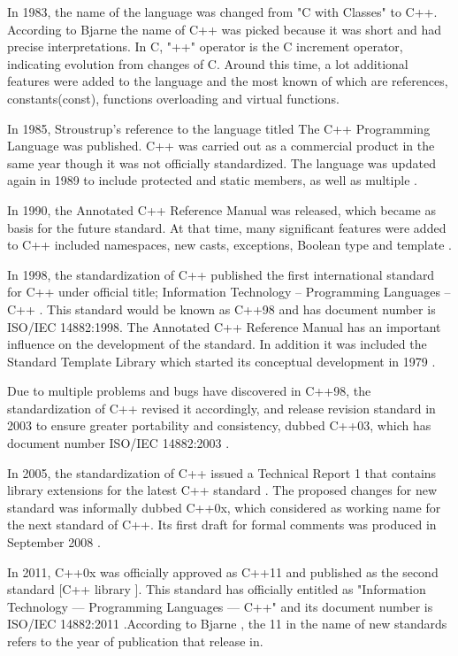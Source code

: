 \documentclass[11pt]{report}
\begin{document}
In 1983, the name of the language was changed from "C with Classes" to C++. According to Bjarne \cite{Stroustrup:1994:DesignEvolution} the name of C++ was picked because it was short and had precise interpretations. In C, "++" operator is the C increment operator, indicating evolution from changes of C.  Around this time, a lot additional features were added to the language and the most known of which are references, constants(const), functions overloading and virtual functions.

In 1985, Stroustrup's reference to the language titled The C++ Programming Language was published. C++ was carried out as a commercial product in the same year though it was not officially standardized. The language was updated again in 1989 to include protected and static members, as well as multiple \cite{CplusplusHistoryofCpp}.

In 1990, the Annotated C++ Reference Manual was released, which became as basis for the future standard. At that time, many significant features were added to C++ included namespaces, new casts, exceptions, Boolean type and template \cite{StroustrupHistory}.

In 1998, the standardization of C++ published the first international standard for C++ under official title; Information Technology -- Programming Languages -- C++ \cite{Josuttis:2012:CppStandardLibrary}. This standard would be known as C++98 and has document number is ISO/IEC 14882:1998. The Annotated C++ Reference Manual has an important influence on the development of the standard.  In addition it was included the Standard Template Library which started its conceptual development in 1979 \cite{CplusplusHistoryofCpp}.  

Due to multiple problems and bugs have discovered in C++98, the standardization of C++ revised it accordingly, and release revision standard in 2003 to ensure greater portability and consistency, dubbed C++03, which has document number ISO/IEC 14882:2003 \cite{Josuttis:2012:CppStandardLibrary}.

In 2005, the standardization of C++ issued a Technical Report 1 that contains library extensions for the latest C++ standard \cite{Josuttis:2012:CppStandardLibrary}. The proposed changes for new standard was informally dubbed C++0x, which considered as working name for the next standard of C++. Its first draft for formal comments was produced in September 2008 \cite{CplusplusHistoryofCpp}. 

In 2011, C++0x was officially approved as C++11 and published as the second standard [C++ library ]. This standard has officially entitled as "Information Technology — Programming Languages — C++" and its document number is ISO/IEC 14882:2011 \cite{Josuttis:2012:CppStandardLibrary}.According to Bjarne \cite{Stroustrup:2012:Cpp11}, the 11 in the name of new standards refers to the year of publication that release in.
\end{document}
